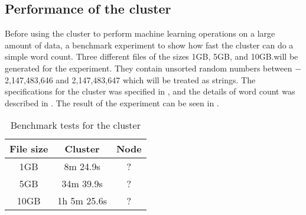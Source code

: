 \subsection{Performance of the cluster}\label{sec:benchmark}
Before using the cluster to perform machine learning operations on a large amount of data, a benchmark experiment to show how fast the cluster can do a simple word count. Three different files of the sizes 1GB, 5GB, and 10GB.\@ will be generated for the experiment. They contain unsorted random numbers between $-$2,147,483,646 and 2,147,483,647 which will be treated as strings. The specifications for the cluster was specified in , and the details of word count was described in . The result of the experiment can be seen in . 
\begin{table}[!htb]
  \centering
  \begin{tabular}{|c|c c|}
    \hline
    File size & Cluster & Node \\
    \hline
    1GB & 8m 24.9s & ? \\ %
    5GB & 34m 39.9s & ? \\ %
    10GB & 1h 5m 25.6s & ? \\ %
    \hline
  \end{tabular}
  \caption{Benchmark tests for the cluster}
  \label{tab:bench}
\end{table}


